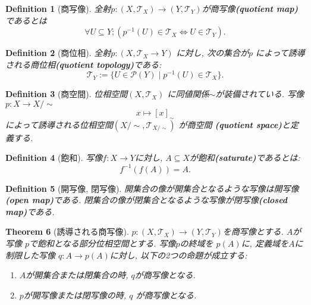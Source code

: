 \documentclass[dvipdfmx]{jbook}
\newtheorem{theorem}{Theorem}[section]
\newtheorem{definition}[theorem]{Definition}
\theoremstyle{remark}
\theoremstyle{plain}
\begin{document}
\begin{definition}[商写像]
	全射$p: \left( X, \mathcal{T}_X \right) \to \left( Y, \mathcal{T}_Y \right)  $が商写像\textbf{(quotient map)}であるとは
	\[
	\forall U \subseteq Y;\left( p^{-1}\left( U \right) \in \mathcal{T}_X \iff U \in \mathcal{T}_Y \right) 
	.\] 
\end{definition}

\begin{definition}[商位相]
	全射$p:\left( X,\mathcal{T}_X \to Y \right) $ に対し, 次の集合が$p$ によって誘導される商位相\textbf{(quotient topology)}である:
	\[
	\mathcal{T}_Y := \{U \in \mathcal{P}\left( Y \right)  \mid p^{-1}\left( U \right)  \in \mathcal{T}_X \} 
	.\] 
	
\end{definition}

\begin{definition}[商空間]
	位相空間$\left( X, \mathcal{T}_X \right) $ に同値関係$\sim$が装備されている. 
	 写像$p: X \to X / \sim $
      $$
	x \mapsto [x]_{\sim}
      $$
      によって誘導される位相空間$\left( X / \sim , \mathcal{T}_{X / \sim} \right) $ が商空間 \textbf{(quotient space)}と定義する.
\end{definition}

\begin{definition}[飽和]
	写像$f:X \to Y$に対し, $A \subseteq X$が飽和\textbf{(saturate)}であるとは:
	\[
	f^{-1}\left(f( A) \right) = A
	.\] 
\end{definition}

\begin{definition}[開写像, 閉写像]
開集合の像が開集合となるような写像は開写像\textbf{(open map)}である. 閉集合の像が閉集合となるような写像が閉写像\textbf{(closed map)}である.	
\end{definition}

\begin{theorem}[誘導される商写像]
	$p: (X,\mathcal{T}_X) \to \left( Y,\mathcal{T}_Y \right) $を商写像とする. $A$が写像 $p$で飽和となる部分位相空間とする.  写像$p$の終域を $p(A)$に, 定義域を$A$に制限した写像 $q: A \to p(A)$に対し, 以下の2つの命題が成立する:
	\begin{enumerate}
		\item $A$が開集合または閉集合の時,  $q$が商写像となる.
		\item  $p$が開写像または閉写像の時,  $q$ が商写像となる.
	\end{enumerate}
\end{theorem}
\end{document}
